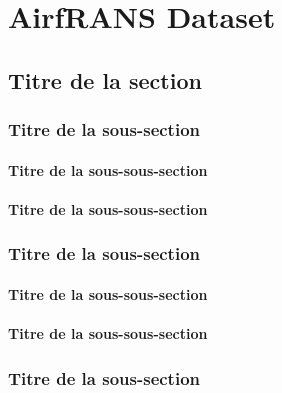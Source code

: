 \chapter{AirfRANS Dataset} %


\section{Titre de la section}
\subsection{Titre de la sous-section}

\subsubsection{Titre de la sous-sous-section}
\subsubsection{Titre de la sous-sous-section}


\subsection{Titre de la sous-section}

\subsubsection{Titre de la sous-sous-section}

\subsubsection{Titre de la sous-sous-section}

\subsection{Titre de la sous-section}


